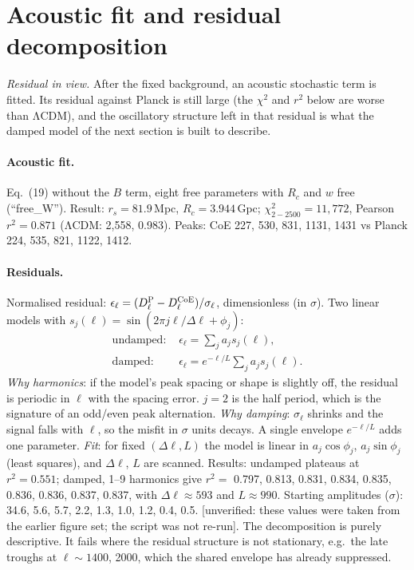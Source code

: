 \documentclass[10pt,twocolumn]{article}
\newcommand{\flag}[1]{\textsf{[unverified: #1]}}
\begin{document}
\section{Acoustic fit and residual decomposition}
\noindent\emph{Residual in view.} After the fixed background, an acoustic stochastic term is fitted. Its residual against Planck is still large (the $\chi^2$ and $r^2$ below are worse than ΛCDM), and the oscillatory structure left in that residual is what the damped model of the next section is built to describe.

\paragraph{Acoustic fit.} Eq.~(19) without the $B$ term, eight free parameters with $R_c$ and $w$ free (``free\_W''). Result: $r_s=81.9$\,Mpc, $R_c=3.944$\,Gpc; $\chi^2_{2-2500}=11{,}772$, Pearson $r^2=0.871$ (ΛCDM: 2{,}558, 0.983). Peaks: CoE 227, 530, 831, 1131, 1431 vs Planck 224, 535, 821, 1122, 1412.

\paragraph{Residuals.} Normalised residual: $\epsilon_\ell=(D^{\rm P}_\ell-D^{\rm CoE}_\ell)/\sigma_\ell$, dimensionless (in $\sigma$). Two linear models with $s_j(\ell)=\sin(2\pi j\ell/\Delta\ell+\phi_j)$:
\begin{align}
\text{undamped: }&\epsilon_\ell=\textstyle\sum_ja_js_j(\ell),\\
\text{damped: }&\epsilon_\ell=e^{-\ell/L}\textstyle\sum_ja_js_j(\ell).
\end{align}
\emph{Why harmonics}: if the model's peak spacing or shape is slightly off, the residual is periodic in $\ell$ with the spacing error. $j=2$ is the half period, which is the signature of an odd/even peak alternation. \emph{Why damping}: $\sigma_\ell$ shrinks and the signal falls with $\ell$, so the misfit in $\sigma$ units decays. A single envelope $e^{-\ell/L}$ adds one parameter. \emph{Fit}: for fixed $(\Delta\ell,L)$ the model is linear in $a_j\cos\phi_j$, $a_j\sin\phi_j$ (least squares), and $\Delta\ell$, $L$ are scanned. Results: undamped plateaus at $r^2=0.551$; damped, 1--9 harmonics give $r^2=$ 0.797, 0.813, 0.831, 0.834, 0.835, 0.836, 0.836, 0.837, 0.837, with $\Delta\ell\approx593$ and $L\approx990$. Starting amplitudes ($\sigma$): 34.6, 5.6, 5.7, 2.2, 1.3, 1.0, 1.2, 0.4, 0.5. \flag{these values were taken from the earlier figure set; the script was not re-run}. The decomposition is purely descriptive. It fails where the residual structure is not stationary, e.g.\ the late troughs at $\ell\sim1400$, 2000, which the shared envelope has already suppressed.
\end{document}
